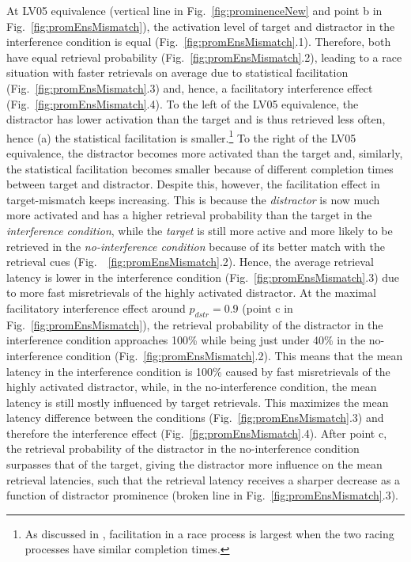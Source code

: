 \documentclass{cambridge7A}\usepackage[]{graphicx}\usepackage[]{color}
\newcommand{\revIV}[1]{#1}
\begin{document}
At LV05 equivalence (vertical line in Fig.~\ref{fig:prominenceNew} and point b in Fig.~\ref{fig:promEnsMismatch}), the activation level of target and distractor in the interference condition is equal (Fig.~\ref{fig:promEnsMismatch}.1). Therefore, both have equal retrieval probability (Fig.~\ref{fig:promEnsMismatch}.2), leading to \revIV{a race situation with} faster retrievals on average due to statistical facilitation (Fig.~\ref{fig:promEnsMismatch}.3) and, hence, a facilitatory interference effect (Fig.~\ref{fig:promEnsMismatch}.4).
To the left of the LV05 equivalence, the distractor has lower activation than the target and is thus retrieved less often, hence (a) the statistical facilitation is smaller.\footnote{
  As discussed in \cite{LogacevVasishth2015}, facilitation in a race process is largest when the two racing processes have similar completion times.} 
To the right of the LV05 equivalence, the distractor becomes more activated than the target and, similarly, the statistical facilitation becomes smaller because of different completion times between target and distractor. Despite this, however, the facilitation effect in target-mismatch keeps increasing. This is because the \emph{distractor} is now much more activated and has a higher retrieval probability than the target in the  \emph{interference condition}, while the \revIV{\emph{target} is still more active and more likely to be retrieved in the \index{no-interference condition} \emph{no-interference condition} because of its better match with the retrieval cues} (Fig.~~\ref{fig:promEnsMismatch}.2). Hence, the average retrieval latency is lower in the interference condition (Fig.~\ref{fig:promEnsMismatch}.3) due to more fast misretrievals of the highly activated distractor. 
At the maximal facilitatory interference effect around $p_{dstr}=0.9$ (point c in Fig.~\ref{fig:promEnsMismatch}), the retrieval probability of the distractor in the interference condition approaches 100\% while being just under 40\% in the no-interference condition (Fig.~\ref{fig:promEnsMismatch}.2). 
This means that the mean latency in the interference condition is 100\% caused by fast misretrievals of the highly activated distractor, while, in the no-interference condition, the mean latency is still mostly influenced by target retrievals.
This maximizes the mean latency difference between the conditions (Fig.~\ref{fig:promEnsMismatch}.3) and therefore the interference effect (Fig.~\ref{fig:promEnsMismatch}.4). 
After point c, the retrieval probability of the distractor in the no-interference condition surpasses that of the target, giving the distractor more influence on the mean retrieval latencies, such that the retrieval latency receives a sharper decrease as a function of distractor prominence (broken line in Fig.~\ref{fig:promEnsMismatch}.3).
\end{document}
